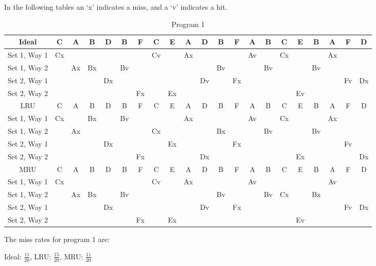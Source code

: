 \documentclass[a4paper, 11pt]{exam}
\begin{document}
\begin{enumerate}
In the following tables an `x' indicates a miss, and a `v' indicates a hit.

\begin{table}[H]
\caption{Program 1}
\begin{center}
\tiny
\begin{tabular}{|c|c|c|c|c|c|c|c|c|c|c|c|c|c|c|c|c|c|c|c|c|}
\hline
Ideal & C & A & B & D & B & F & C & E & A & D & B & F & A & B & C & E & B & A & F & D \\
\hline
Set 1, Way 1 & Cx &  &  &  &  &  & Cv &  & Ax &  &  &  & Av &  & Cx &  &  & Ax  & & \\
Set 1, Way 2 &  & Ax & Bx &  & Bv &  &  &  &  &  & Bv &  &  & Bv &  &  & Bv & & & \\
\hline
Set 2, Way 1 &  &  &  & Dx &  &  &  &  &  & Dv &  & Fx &  &  &  &  &  &  & Fv & Dx \\
Set 2, Way 2 &  &  &  &  &  & Fx &  & Ex &  &  &  &  &  &  &  & Ev & &  &  &\\
\hline
\hline
LRU & C & A & B & D & B & F & C & E & A & D & B & F & A & B & C & E & B & A & F & D \\
\hline
Set 1, Way 1 & Cx &  & Bx &  & Bv &  &  &  & Ax &  &  &  & Av &  & Cx &  &  & Ax& & \\
Set 1, Way 2 &  & Ax &  &  &  &  & Cx &  &  &  & Bx &  &  & Bv &  &  & Bv & & & \\
\hline
Set 2, Way 1 &  &  &  & Dx &  &  &  & Ex &  &  &  & Fx &  &  &  &  &  &  & Fv &\\
Set 2, Way 2 &  &  &  &  &  & Fx &  &  &  & Dx &  &  &  &  &  & Ex &  &  &  & Dx \\
\hline
\hline
MRU & C & A & B & D & B & F & C & E & A & D & B & F & A & B & C & E & B & A & F & D \\
\hline
Set 1, Way 1 & Cx &  &  &  &  &  & Cv &  & Ax &  &  &  & Av &  &  &  &  & Av & &  \\
Set 1, Way 2 &  & Ax & Bx &  & Bv &  &  &  &  &  & Bv &  &  & Bv & Cx &  & Bx & & &  \\
\hline
Set 2, Way 1 &  &  &  & Dx &  &  &  &  &  & Dv &  & Fx &  &  &  &  &  &  & Fv & Dx \\
Set 2, Way 2 &  &  &  &  &  & Fx &  & Ex &  &  &  &  &  &  &  & Ev  & & & & \\
\hline
\end{tabular}
\end{center}
\label{default}
\end{table}%
The miss rates for program 1 are:

Ideal: $\frac{11}{20}$, LRU: $\frac{15}{20}$, MRU: $\frac{11}{20}$


\end{enumerate}
\end{document}
